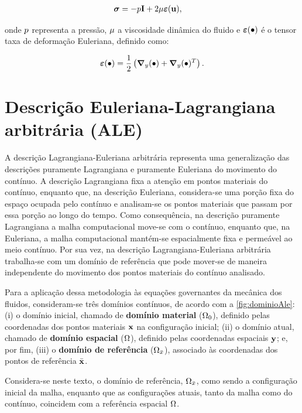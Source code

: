 \begin{align}
\boldsymbol{\sigma} &= -p \mathbf{I} + 2\mu\bm{\varepsilon}(\mathbf{u}),\label{eq:tensor_tensoes_fluido}
\end{align}

\noindent onde $p$ representa a pressão, $\mu$ a viscosidade dinâmica do fluido e $\bm{\varepsilon}(\bullet)$ é o tensor taxa de deformação Euleriana, definido como:

\begin{align}
\bm{\varepsilon}(\bullet) = \frac{1}{2}\left(\boldsymbol{\nabla}_y (\bullet) + \boldsymbol{\nabla}_y (\bullet)^{T}\right). 
\label{eq:tensor_taxa_defor}
\end{align}


\section{Descrição Euleriana-Lagrangiana arbitrária (ALE)} \label{capitulo:Cap2:ALE}

A descrição Lagrangiana-Euleriana arbitrária \cite{DoneaGH:1982,HughesLZ:1981} representa uma generalização das descrições puramente Lagrangiana e puramente Euleriana do movimento do contínuo. A descrição Lagrangiana fixa a atenção em pontos materiais do contínuo, enquanto que, na descrição Euleriana, considera-se uma porção fixa do espaço ocupada pelo contínuo e analisam-se os pontos materiais que passam por essa porção ao longo do tempo. Como consequência, na descrição puramente Lagrangiana a malha computacional move-se com o contínuo, enquanto que, na Euleriana, a malha computacional mantém-se espacialmente fixa e permeável ao meio contínuo. Por sua vez, na descrição Lagrangiana-Euleriana arbitrária trabalha-se com um domínio de referência que pode mover-se de maneira independente do movimento dos pontos materiais do contínuo analisado.

Para a aplicação dessa metodologia às equações governantes da mecânica dos fluidos, consideram-se três domínios contínuos, de acordo com a \autoref{fig:dominioAle}: (i) o domínio inicial, chamado de \textbf{domínio material} ($\Omega_{0}$), definido pelas coordenadas dos pontos materiais $\mathbf{x}$ na configuração inicial; (ii) o domínio atual, chamado de \textbf{domínio espacial} ($\Omega$), definido pelas coordenadas espaciais $\mathbf{y}$; e, por fim, (iii) o \textbf{domínio de referência} ($\Omega_{\bar{x}}$), associado às coordenadas dos pontos de referência $\bar{\mathbf{x}}$.

Considera-se neste texto, o domínio de referência, $\Omega_{\bar{x}}$, como sendo a configuração inicial da malha, enquanto que as configurações atuais, tanto da malha como do contínuo, coincidem com a referência espacial $\Omega$.

